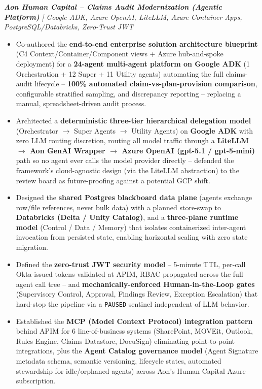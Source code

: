 \documentclass[letterpaper,10pt]{article}
\newcommand{\resumeItem}[1]{
  \item\small{
    {#1 \vspace{-2pt}}
  }
}
\newcommand{\resumeItemListStart}{\begin{itemize}}
\newcommand{\resumeItemListEnd}{\end{itemize}\vspace{-5pt}}
\begin{document}
      \vspace{12pt}
      \vspace{12pt}
      \textit{\small\textbf{Aon Human Capital -- Claims Audit Modernization (Agentic Platform)} | Google ADK, Azure OpenAI, LiteLLM, Azure Container Apps, PostgreSQL/Databricks, Zero-Trust JWT}
      \resumeItemListStart
        \resumeItem{Co-authored the \textbf{end-to-end enterprise solution architecture blueprint} (C4 Context/Container/Component views + Azure hub-and-spoke deployment) for a \textbf{24-agent multi-agent platform on Google ADK} (1 Orchestration + 12 Super + 11 Utility agents) automating the full claims-audit lifecycle -- \textbf{100\% automated claim-vs-plan-provision comparison}, configurable stratified sampling, and discrepancy reporting -- replacing a manual, spreadsheet-driven audit process.}
        \resumeItem{Architected a \textbf{deterministic three-tier hierarchical delegation model} (Orchestrator $\rightarrow$ Super Agents $\rightarrow$ Utility Agents) on \textbf{Google ADK} with zero LLM routing discretion, routing all model traffic through a \textbf{LiteLLM $\rightarrow$ Aon GenAI Wrapper $\rightarrow$ Azure OpenAI (gpt-5.1 / gpt-5-mini)} path so no agent ever calls the model provider directly -- defended the framework's cloud-agnostic design (via the LiteLLM abstraction) to the review board as future-proofing against a potential GCP shift.}
        \resumeItem{Designed the \textbf{shared Postgres blackboard data plane} (agents exchange row/file references, never bulk data) with a planned store-swap to \textbf{Databricks (Delta / Unity Catalog)}, and a \textbf{three-plane runtime model} (Control / Data / Memory) that isolates containerized inter-agent invocation from persisted state, enabling horizontal scaling with zero state migration.}
        \resumeItem{Defined the \textbf{zero-trust JWT security model} -- 5-minute TTL, per-call Okta-issued tokens validated at APIM, RBAC propagated across the full agent call tree -- and \textbf{mechanically-enforced Human-in-the-Loop gates} (Supervisory Control, Approval, Findings Review, Exception Escalation) that hard-stop the pipeline via a \texttt{PAUSED} sentinel independent of LLM behavior.}
        \resumeItem{Established the \textbf{MCP (Model Context Protocol) integration pattern} behind APIM for 6 line-of-business systems (SharePoint, MOVEit, Outlook, Rules Engine, Claims Datastore, DocuSign) eliminating point-to-point integrations, plus the \textbf{Agent Catalog governance model} (Agent Signature metadata schema, semantic versioning, lifecycle states, automated stewardship for idle/orphaned agents) across Aon's Human Capital Azure subscription.}
      \resumeItemListEnd
\end{document}
